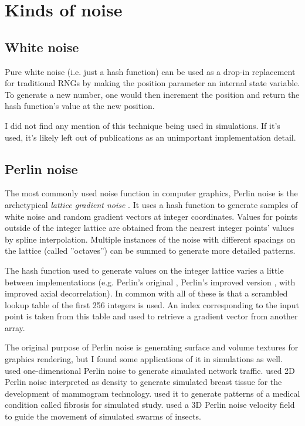 \documentclass{article}
\begin{document}
\section*{Kinds of noise}

\subsection*{White noise}

Pure white noise (i.e. just a hash function) can be used as a drop-in
replacement for traditional RNGs by making the position parameter an internal
state variable.  To generate a new number, one would then increment the
position and return the hash function's value at the new position.
\parencite{eiserloh_noise-based_2017}

I did not find any mention of this technique being used in simulations. If it's
used, it's likely left out of publications as an unimportant implementation
detail.

\subsection*{Perlin noise}

The most commonly used noise function in computer graphics, Perlin noise
\parencite{perlin_image_1985,perlin_improving_2002} is the archetypical
\textit{lattice gradient noise} \parencite{lagae_survey_2010}. It uses a hash
function to generate samples of white noise and random gradient vectors at
integer coordinates. Values for points outside of the integer lattice are
obtained from the nearest integer points' values by spline interpolation.
Multiple instances of the noise with different spacings on the lattice (called
''octaves'') can be summed to generate more detailed patterns.

The hash function used to generate values on the integer lattice varies a
little between implementations (e.g. Perlin's original
\parencite*{perlin_image_1985}, Perlin's improved version
\parencite*{perlin_improving_2002}, \textcite{kensler_better_2008} with
improved axial decorrelation).  In common with all of these is that a scrambled
lookup table of the first 256 integers is used. An index corresponding to the
input point is taken from this table and used to retrieve a gradient vector
from another array.

The original purpose of Perlin noise is generating surface and volume textures
for graphics rendering, but I found some applications of it in simulations as
well.  \textcite{prieto_traffic_2012} used one-dimensional Perlin noise to
generate simulated network traffic. \textcite{barufaldi_computational_2021}
used 2D Perlin noise interpreted as density to generate simulated breast tissue
for the development of mammogram technology. \textcite{jakes_perlin_2019} used
it to generate patterns of a medical condition called fibrosis for simulated
study. \textcite{wang_inherent_2014} used a 3D Perlin noise velocity field to
guide the movement of simulated swarms of insects.

\printbibliography
\end{document}
